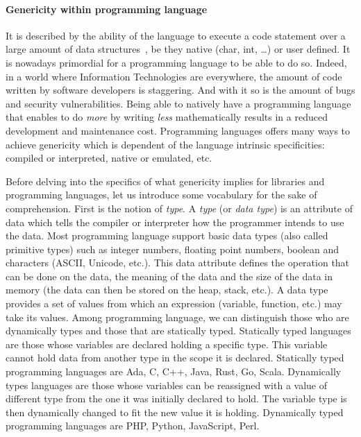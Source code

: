 \paragraph{Genericity within programming language} It is described by the ability of the language to execute a code
statement over a large amount of data structures~\parencite{dehnert.1998.fundamentals}, be they native (char, int,
\ldots) or user defined. It is nowadays primordial for a programming language to be able to do so. Indeed, in a world
where Information Technologies are everywhere, the amount of code written by software developers is staggering. And with
it so is the amount of bugs and security vulnerabilities. Being able to natively have a programming language that
enables to do \emph{more} by writing \emph{less} mathematically results in a reduced development and maintenance cost.
Programming languages offers many ways to achieve genericity which is dependent of the language intrinsic specificities:
compiled or interpreted, native or emulated, etc.

Before delving into the specifics of what genericity implies for libraries and programming languages, let us introduce
some vocabulary for the sake of comprehension. First is the notion of \emph{type}. A \emph{type} (or \emph{data type})
is an attribute of data which tells the compiler or interpreter how the programmer intends to use the data. Most
programming language support basic data types (also called primitive types) such as integer numbers, floating point
numbers, boolean and characters (ASCII, Unicode, etc.). This data attribute defines the operation that can be done on
the data, the meaning of the data and the size of the data in memory (the data can then be stored on the heap, stack,
etc.). A data type provides a set of values from which an expression (\ie variable, function, etc.) may take its
values. Among programming language, we can distinguish those who are dynamically types and those that are statically
typed. Statically typed languages are those whose variables are declared holding a specific type. This variable cannot
hold data from another type in the scope it is declared. Statically typed programming languages are Ada, C, C++, Java,
Rust, Go, Scala. Dynamically types languages are those whose variables can be reassigned with a value of different type
from the one it was initially declared to hold. The variable type is then dynamically changed to fit the new value it is
holding. Dynamically typed programming languages are PHP, Python, JavaScript, Perl.

